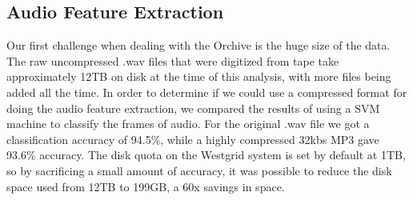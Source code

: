 \subsection{Audio Feature Extraction}

Our first challenge when dealing with the Orchive is the huge size of
the data.  The raw uncompressed .wav files that were digitized from
tape take approximately 12TB on disk at the time of this analysis,
with more files being added all the time.  In order to determine if we
could use a compressed format for doing the audio feature extraction,
we compared the results of using a SVM machine to classify the frames
of audio.  For the original .wav file we got a classification accuracy
of 94.5\%, while a highly compressed 32kbs MP3 gave 93.6\% accuracy.
The disk quota on the Westgrid system is set by default at 1TB, so by
sacrificing a small amount of accuracy, it was possible to reduce the
disk space used from 12TB to 199GB, a 60x savings in space.

